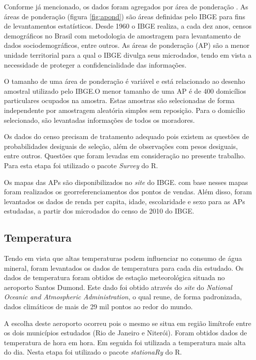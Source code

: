 \documentclass[
  12pt,
]{book}
\begin{document}
Conforme já mencionado, os dados foram agregados por área de ponderação . As áreas de ponderação (figura \ref{fig:apond}) são áreas definidas pelo IBGE para fins de levantamentos estatísticos. Desde 1960 o IBGE realiza, a cada dez anos, censos demográficos no Brasil com metodologia de amostragem para levantamento de dados sociodemográficos, entre outros. As áreas de ponderação (AP) são a menor unidade territorial para a qual o IBGE divulga seus microdados, tendo em vista a necessidade de proteger a confidencialidade das informações.

O tamanho de uma área de ponderação é variável e está relacionado ao desenho amostral utilizado pelo IBGE.O menor tamanho de uma AP é de 400 domicílios particulares ocupados na amostra. Estas amostras são selecionadas de forma independente por amostragem aleatória simples sem reposição. Para o domicílio selecionado, são levantadas informações de todos os moradores.

Os dados do censo precisam de tratamento adequado pois existem as questões de probabilidades desiguais de seleção, além de observações com pesos desiguais, entre outros. Questões que foram levadas em consideração no presente trabalho. Para esta etapa foi utilizado o pacote \emph{Survey} \citep{psurvey} do R.

Os mapas das APs são disponibilizados no \emph{site} do IBGE. com base nesses mapas foram realizados os georreferenciamentos dos pontos de vendas. Além disso, foram levantados os dados de renda per capita, idade, escolaridade e sexo para as APs estudadas, a partir dos microdados do censo de 2010 do IBGE.

\hypertarget{temperatura}{%
\subsection{Temperatura}\label{temperatura}}

Tendo em vista que altas temperaturas podem influenciar no consumo de água mineral, foram levantados os dados de temperatura para cada dia estudado. Os dados de temperatura foram obtidos de estação meteorológica situada no aeroporto Santos Dumond. Este dado foi obtido através do \emph{site} do \emph{National Oceanic and Atmospheric Administration}, o qual reune, de forma padronizada, dados climáticos de mais de 29 mil pontos ao redor do mundo.

A escolha deste aeroporto ocorreu pois o mesmo se situa em região limítrofe entre os dois municípios estudados (Rio de Janeiro e Niterói). Foram obtidos dados de temperatura de hora em hora. Em seguida foi utilizada a temperatura mais alta do dia. Nesta etapa foi utilizado o pacote \emph{stationaRy} \citep{stationaRy} do R.
\end{document}

